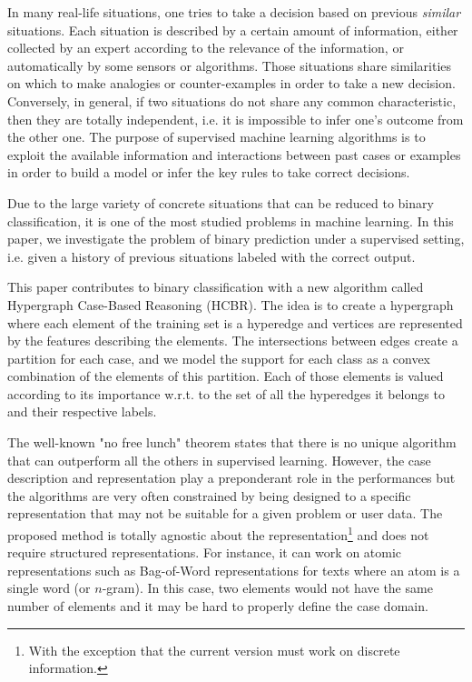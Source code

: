 \documentclass[sigconf,edbt]{acmart-edbt-workshops}
\def\HCBR{{\sc HCBR}}
\begin{document}
In many real-life situations, one tries to take a decision based on previous {\it similar} situations. Each situation is described by a certain amount of information, either collected by an expert according to the relevance of the information, or automatically by some sensors or algorithms. Those situations share similarities on which to make analogies or counter-examples in order to take a new decision. Conversely, in general, if two situations do not share any common characteristic, then they are totally independent, i.e. it is impossible to infer one's outcome from the other one. The purpose of supervised machine learning algorithms is to exploit the available information and interactions between past cases or examples in order to build a model or infer the key rules to take correct decisions.

Due to the large variety of concrete situations that can be reduced to binary classification, it is one of the most studied problems in machine learning. In this paper, we investigate the problem of binary prediction under a supervised setting, i.e. given a history of previous situations labeled with the correct output.

This paper contributes to binary classification with a new algorithm called Hypergraph Case-Based Reasoning (\HCBR). The idea is to create a hypergraph where each element of the training set is a hyperedge and vertices are represented by the features describing the elements. The intersections between edges create a partition for each case, and we model the support for each class as a convex combination of the elements of this partition. Each of those elements is valued according to its importance w.r.t. to the set of all the hyperedges it belongs to and their respective labels.

The well-known "no free lunch" theorem states that there is no unique algorithm that can outperform all the others in supervised learning. However, the case description and representation play a preponderant role in the performances but the algorithms are very often constrained by being designed to a specific representation that may not be suitable for a given problem or user data. The proposed method is totally agnostic about the representation\footnote{With the exception that the current version must work on discrete information.} and does not require structured representations. For instance, it can work on atomic representations such as Bag-of-Word representations for texts where an atom is a single word (or $n$-gram). In this case, two elements would not have the same number of elements and it may be hard to properly define the case domain.
\end{document}
